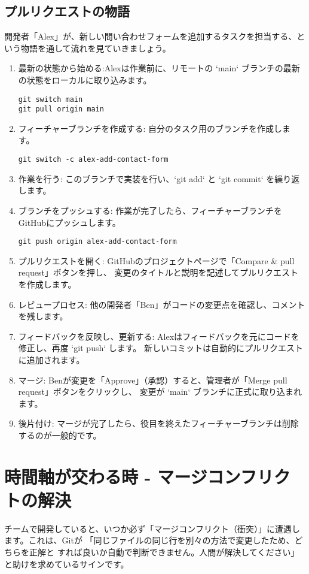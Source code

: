 \documentclass{ltjsarticle}
\begin{document}
\subsection{プルリクエストの物語}
開発者「Alex」が、新しい問い合わせフォームを追加するタスクを担当する、という物語を通して流れを見ていきましょう。
\begin{enumerate}
    \item 最新の状態から始める:Alexは作業前に、リモートの `main` ブランチの最新の状態をローカルに取り込みます。
    \begin{verbatim}
git switch main
git pull origin main
\end{verbatim}
    \item フィーチャーブランチを作成する: 自分のタスク用のブランチを作成します。
    \begin{verbatim}
git switch -c alex-add-contact-form
\end{verbatim}
    \item 作業を行う: このブランチで実装を行い、`git add` と `git commit` を繰り返します。
    \item ブランチをプッシュする: 作業が完了したら、フィーチャーブランチをGitHubにプッシュします。
    \begin{verbatim}
git push origin alex-add-contact-form
\end{verbatim}
    \item プルリクエストを開く: GitHubのプロジェクトページで「Compare \& pull request」ボタンを押し、
		変更のタイトルと説明を記述してプルリクエストを作成します。
    \item レビュープロセス: 他の開発者「Ben」がコードの変更点を確認し、コメントを残します。
    \item フィードバックを反映し、更新する: Alexはフィードバックを元にコードを修正し、再度 `git push` します。
		新しいコミットは自動的にプルリクエストに追加されます。
    \item マージ: Benが変更を「Approve」（承認）すると、管理者が「Merge pull request」ボタンをクリックし、
		変更が `main` ブランチに正式に取り込まれます。
    \item 後片付け: マージが完了したら、役目を終えたフィーチャーブランチは削除するのが一般的です。
\end{enumerate}

\section{時間軸が交わる時 - マージコンフリクトの解決}
チームで開発していると、いつか必ず「マージコンフリクト（衝突）」に遭遇します。これは、Gitが
「同じファイルの同じ行を別々の方法で変更したため、どちらを正解と
すれば良いか自動で判断できません。人間が解決してください」と助けを求めているサインです。
\end{document}
